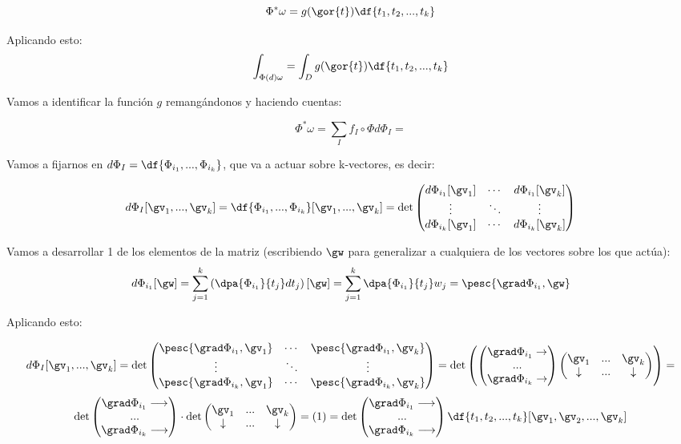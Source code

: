 \[
\Phi^{\ast}\omega =g(\gor{t})\df{t_1,t_2,...,t_k}
\]

Aplicando esto:
\[
\int_{\Phi(d) \omega} = \int_D g(\gor{t})\df{t_1,t_2,...,t_k}
\]

Vamos a identificar la función $g$ remangándonos y haciendo cuentas:

\[
\Phi^{\ast} \omega = \sum_I f_I\circ\Phi d\Phi_I = 
\]

Vamos a fijarnos en 
$d\Phi_I = \df{\Phi_{i_1},...,\Phi_{i_k}}$, que va a actuar sobre k-vectores, es decir:

\[
d\Phi_I[\gv_1,...,\gv_k] = \df{\Phi_{i_1},...,\Phi_{i_k}} [\gv_1,...,\gv_k] = \det \begin{pmatrix}
d\Phi_{i_1}[\gv_1] &\cdots& d\Phi_{i_1}[\gv_k] \\
\vdots & \ddots & \vdots\\
d\Phi_{i_k}[\gv_1] & \cdots & d\Phi_{i_k}[\gv_k] \\
\end{pmatrix}
\]

Vamos a desarrollar 1 de los elementos de la matriz (escribiendo $\gw$ para generalizar a cualquiera de los vectores sobre los que actúa):
\[
d\Phi_{i_1}[\gw] = \sum_{j=1}^k \left(\dpa{\Phi_{i_1}}{t_j} dt_j\right)[\gw] = \sum_{j=1}^k \dpa{\Phi_{i_1}}{t_j}w_j = \pesc{\grad \Phi_{i_1},\gw}
\]

Aplicando esto:

\[d\Phi_I[\gv_1,...,\gv_k] =  \det \begin{pmatrix}
\pesc{\grad \Phi_{i_1},\gv_1} &\cdots&  \pesc{\grad \Phi_{i_1},\gv_k}\\
\vdots & \ddots & \vdots\\
\pesc{\grad \Phi_{i_k},\gv_1} & \cdots & \pesc{\grad \Phi_{i_k},\gv_k} \\
\end{pmatrix} = \det \left(\begin{pmatrix}
\grad \Phi_{i_1} \rightarrow \\
...\\
\grad \Phi_{i_k} \rightarrow 
\end{pmatrix}
\begin{pmatrix}
\gv_1 & ... & \gv_k\\
\downarrow & ... & \downarrow
\end{pmatrix}\right) =\]
\[ \det\begin{pmatrix}
\grad \Phi_{i_1} \longrightarrow \\
...\\
\grad \Phi_{i_k} \longrightarrow 
\end{pmatrix} \cdot \det 
\begin{pmatrix}
\gv_1 & ... & \gv_k\\
\downarrow & ... & \downarrow
\end{pmatrix} = (1) =
\det\begin{pmatrix}
\grad \Phi_{i_1} \longrightarrow \\
...\\
\grad \Phi_{i_k} \longrightarrow 
\end{pmatrix} \df{t_1,t_2,...,t_k}[\gv_1,\gv_2,...,\gv_k]
\]

